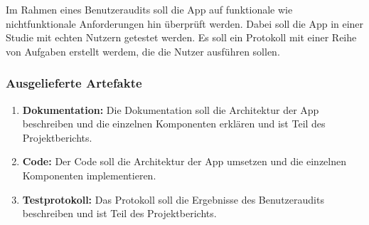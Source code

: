 Im Rahmen eines Benutzeraudits soll die App auf funktionale wie nichtfunktionale Anforderungen hin überprüft werden.
Dabei soll die App in einer Studie mit echten Nutzern getestet werden.
Es soll ein Protokoll mit einer Reihe von Aufgaben erstellt werdem, die die Nutzer ausführen sollen.

\subsubsection{Ausgelieferte Artefakte}

\begin{enumerate}
	\item \textbf{Dokumentation:} Die Dokumentation soll die Architektur der App beschreiben und die einzelnen Komponenten erklären und ist Teil des Projektberichts.
	\item \textbf{Code:} Der Code soll die Architektur der App umsetzen und die einzelnen Komponenten implementieren.
	\item \textbf{Testprotokoll:} Das Protokoll soll die Ergebnisse des Benutzeraudits beschreiben und ist Teil des Projektberichts.
\end{enumerate}